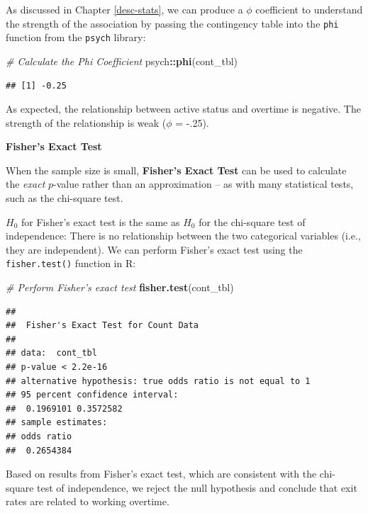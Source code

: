 \documentclass[]{book}
\newenvironment{Shaded}{\begin{snugshade}}{\end{snugshade}}
\newcommand{\CommentTok}[1]{\textcolor[rgb]{0.56,0.35,0.01}{\textit{#1}}}
\newcommand{\KeywordTok}[1]{\textcolor[rgb]{0.13,0.29,0.53}{\textbf{#1}}}
\newcommand{\NormalTok}[1]{#1}
\newcommand{\OperatorTok}[1]{\textcolor[rgb]{0.81,0.36,0.00}{\textbf{#1}}}
\begin{document}
As discussed in Chapter \ref{desc-stats}, we can produce a \(\phi\) coefficient to understand the strength of the association by passing the contingency table into the \texttt{phi} function from the \texttt{psych} library:

\begin{Shaded}
\begin{Highlighting}[]
\CommentTok{# Calculate the Phi Coefficient}
\NormalTok{psych}\OperatorTok{::}\KeywordTok{phi}\NormalTok{(cont_tbl)}
\end{Highlighting}
\end{Shaded}

\begin{verbatim}
## [1] -0.25
\end{verbatim}

As expected, the relationship between active status and overtime is negative. The strength of the relationship is weak (\(\phi\) = -.25).

\textbf{Fisher's Exact Test}

When the sample size is small, \textbf{Fisher's Exact Test} can be used to calculate the \emph{exact} \(p\)-value rather than an approximation -- as with many statistical tests, such as the chi-square test.

\(H_0\) for Fisher's exact test is the same as \(H_0\) for the chi-square test of independence: There is no relationship between the two categorical variables (i.e., they are independent). We can perform Fisher's exact test using the \texttt{fisher.test()} function in R:

\begin{Shaded}
\begin{Highlighting}[]
\CommentTok{# Perform Fisher's exact test}
\KeywordTok{fisher.test}\NormalTok{(cont_tbl)}
\end{Highlighting}
\end{Shaded}

\begin{verbatim}
## 
##  Fisher's Exact Test for Count Data
## 
## data:  cont_tbl
## p-value < 2.2e-16
## alternative hypothesis: true odds ratio is not equal to 1
## 95 percent confidence interval:
##  0.1969101 0.3572582
## sample estimates:
## odds ratio 
##  0.2654384
\end{verbatim}

Based on results from Fisher's exact test, which are consistent with the chi-square test of independence, we reject the null hypothesis and conclude that exit rates are related to working overtime.
\end{document}

